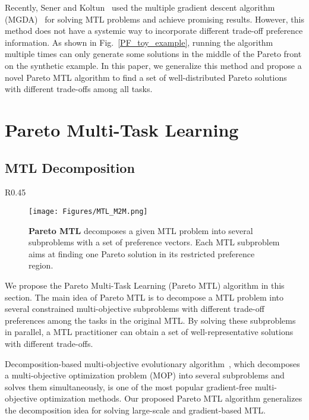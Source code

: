 Recently, Sener and Koltun~\cite{sener2018multi} used the multiple gradient descent algorithm (MGDA)~\cite{desideri2012mutiple} for solving MTL problems and achieve promising results. However, this method does not have a systemic way to incorporate different trade-off preference information. As shown in Fig.~\ref{PF_toy_example}, running the algorithm multiple times can only generate some solutions in the middle of the Pareto front on the synthetic example. In this paper, we generalize this method and propose a novel Pareto MTL algorithm to find a set of well-distributed Pareto solutions with different trade-offs among all tasks.

\section{Pareto Multi-Task Learning}

\subsection{MTL Decomposition}

\begin{wrapfigure}{R}{0.45\linewidth}
	\begin{minipage}{\linewidth}
    \begin{figure}[H]
    	\centering
    	\texttt{[image: Figures/MTL\_M2M.png]}
    	\caption{\textbf{Pareto MTL} decomposes a given MTL problem into several subproblems with a set of preference vectors. Each MTL subproblem aims at finding one Pareto solution in its restricted preference region.}
        \label{MOPM2M}
    \end{figure}
	\end{minipage}
\end{wrapfigure}

We propose the Pareto Multi-Task Learning (Pareto MTL) algorithm in this section. The main idea of Pareto MTL is to decompose a MTL problem into several constrained multi-objective subproblems with different trade-off preferences among the tasks in the original MTL. By solving these subproblems in parallel, a MTL practitioner can obtain a set of well-representative solutions with different trade-offs.

Decomposition-based multi-objective evolutionary algorithm~\cite{zhang2007moea,trivedi2016survey}, which decomposes a multi-objective optimization problem (MOP) into several subproblems and solves them simultaneously, is one of the most popular gradient-free multi-objective optimization methods. Our proposed Pareto MTL algorithm generalizes the decomposition idea for solving large-scale and gradient-based MTL.

